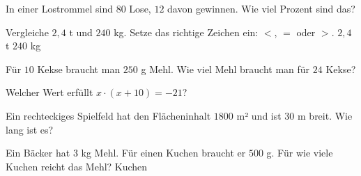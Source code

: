 \documentclass[11pt]{article}
\begin{document}
\noindent\begin{minipage}[t]{0.485\linewidth}\raggedright
\begin{aufgabe}{In einer Lostrommel sind $80$ Lose, $12$ davon gewinnen. Wie viel Prozent sind das? \leerfeld[\%]}
\end{aufgabe}
\end{minipage}\hfill\begin{minipage}[t]{0.485\linewidth}\raggedright
\begin{aufgabe}{Vergleiche $2{,}4$ t und $240$ kg. Setze das richtige Zeichen ein: $<$, $=$ oder $>$. $2{,}4$ t \leerfeld $240$ kg}
\end{aufgabe}
\end{minipage}\par

\noindent\begin{minipage}[t]{0.485\linewidth}\raggedright
\begin{aufgabe}{Für $10$ Kekse braucht man $250$ g Mehl. Wie viel Mehl braucht man für $24$ Kekse? \leerfeld[g]}
\end{aufgabe}
\end{minipage}\hfill\begin{minipage}[t]{0.485\linewidth}\raggedright
\begin{aufgabe}{Welcher Wert erfüllt $x \cdot (x + 10) = -21$? \\    }
\end{aufgabe}
\end{minipage}\par

\begin{aufgabe}{Ein rechteckiges Spielfeld hat den Flächeninhalt $1800$ m² und ist $30$ m breit. Wie lang ist es? \leerfeld[m]}
\end{aufgabe}

\begin{aufgabe}{Ein Bäcker hat $3$ kg Mehl. Für einen Kuchen braucht er $500$ g. Für wie viele Kuchen reicht das Mehl? \leerfeld Kuchen}
\end{aufgabe}
\end{document}
